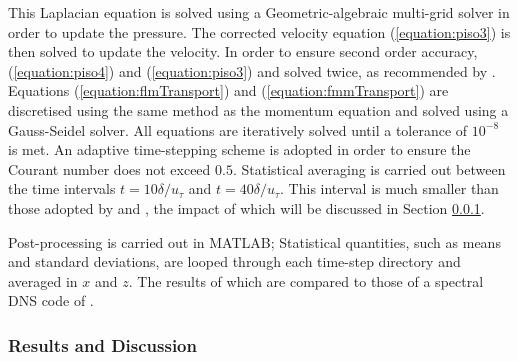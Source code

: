 \documentclass[12pt,oneside,a4paper]{article}
\begin{document}
This Laplacian equation is solved using a Geometric-algebraic multi-grid solver in order to update the pressure. The corrected velocity equation (\ref{equation:piso3}) is then solved to update the velocity. In order to ensure second order accuracy, (\ref{equation:piso4}) and (\ref{equation:piso3}) and solved twice, as recommended by \cite{issa1986}. Equations (\ref{equation:flmTransport}) and (\ref{equation:fmmTransport}) are discretised using the same method as the momentum equation and solved using a Gauss-Seidel solver. All equations are iteratively solved until a tolerance of $10^{-8}$ is met. An adaptive time-stepping scheme is adopted in order to ensure the Courant number does not exceed $0.5$. Statistical averaging is carried out between the time intervals $t=10 \delta / u_\tau$ and $t = 40 \delta / u_\tau$. This interval is much smaller than those adopted by \cite{kim1987} and \cite{vreman2014}, the impact of which will be discussed in Section \ref{section:lesResults}.

Post-processing is carried out in MATLAB; Statistical quantities, such as means and standard deviations, are looped through each time-step directory and averaged in $x$ and $z$. The results of which are compared to those of a spectral DNS code of \cite{vreman2014}.

\subsubsection{Results and Discussion}
\label{section:lesResults}
\end{document}
